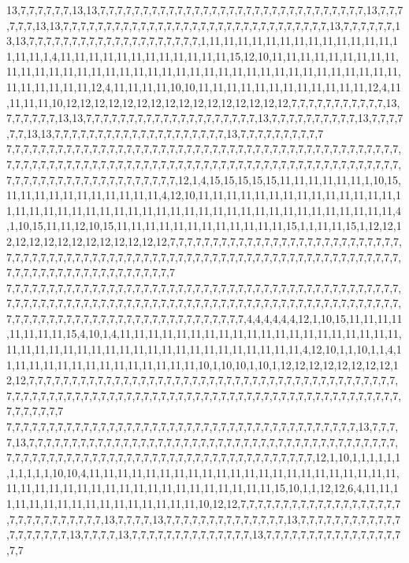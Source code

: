 13,7,7,7,7,7,7,13,13,7,7,7,7,7,7,7,7,7,7,7,7,7,7,7,7,7,7,7,7,7,7,7,7,7,7,7,7,7,7,7,13,7,7,7,7,7,7,13,13,7,7,7,7,7,7,7,7,7,7,7,7,7,7,7,7,7,7,7,7,7,7,7,7,7,7,7,7,7,7,7,13,7,7,7,7,7,7,13,13,7,7,7,7,7,7,7,7,7,7,7,7,7,7,7,7,7,7,7,7,1,11,11,11,11,11,11,11,11,11,11,11,11,11,11,11,11,1,4,11,11,11,11,11,11,11,11,11,11,11,11,15,12,10,11,11,11,11,11,11,11,11,11,11,11,11,11,11,11,11,11,11,11,11,11,11,11,11,11,11,11,11,11,11,11,11,11,11,11,11,11,11,11,11,11,11,11,12,4,11,11,11,11,10,10,11,11,11,11,11,11,11,11,11,11,11,11,12,4,11,11,11,11,10,12,12,12,12,12,12,12,12,12,12,12,12,12,12,12,12,7,7,7,7,7,7,7,7,7,7,7,13,7,7,7,7,7,7,13,13,7,7,7,7,7,7,7,7,7,7,7,7,7,7,7,7,7,7,7,7,13,7,7,7,7,7,7,7,7,7,7,13,7,7,7,7,7,7,13,13,7,7,7,7,7,7,7,7,7,7,7,7,7,7,7,7,7,7,7,7,13,7,7,7,7,7,7,7,7,7,7
7,7,7,7,7,7,7,7,7,7,7,7,7,7,7,7,7,7,7,7,7,7,7,7,7,7,7,7,7,7,7,7,7,7,7,7,7,7,7,7,7,7,7,7,7,7,7,7,7,7,7,7,7,7,7,7,7,7,7,7,7,7,7,7,7,7,7,7,7,7,7,7,7,7,7,7,7,7,7,7,7,7,7,7,7,7,7,7,7,7,7,7,7,7,7,7,7,7,7,7,7,7,7,7,7,7,7,7,7,7,7,7,12,1,4,15,15,15,15,15,11,11,11,11,11,11,1,10,15,11,11,11,11,11,11,11,11,11,11,11,4,12,10,11,11,11,11,11,11,11,11,11,11,11,11,11,11,11,11,11,11,11,11,11,11,11,11,11,11,11,11,11,11,11,11,11,11,11,11,11,11,11,11,11,11,4,1,10,15,11,11,12,10,15,11,11,11,11,11,11,11,11,11,11,11,11,15,1,1,11,11,15,1,12,12,12,12,12,12,12,12,12,12,12,12,12,12,7,7,7,7,7,7,7,7,7,7,7,7,7,7,7,7,7,7,7,7,7,7,7,7,7,7,7,7,7,7,7,7,7,7,7,7,7,7,7,7,7,7,7,7,7,7,7,7,7,7,7,7,7,7,7,7,7,7,7,7,7,7,7,7,7,7,7,7,7,7,7,7,7,7,7,7,7,7,7,7,7,7,7,7,7,7,7,7,7,7,7,7,7
7,7,7,7,7,7,7,7,7,7,7,7,7,7,7,7,7,7,7,7,7,7,7,7,7,7,7,7,7,7,7,7,7,7,7,7,7,7,7,7,7,7,7,7,7,7,7,7,7,7,7,7,7,7,7,7,7,7,7,7,7,7,7,7,7,7,7,7,7,7,7,7,7,7,7,7,7,7,7,7,7,7,7,7,7,7,7,7,7,7,7,7,7,7,7,7,7,7,7,7,7,7,7,7,7,7,7,7,7,7,7,7,7,7,7,7,7,7,7,7,4,4,4,4,4,4,12,1,10,15,11,11,11,11,11,11,11,11,15,4,10,1,4,11,11,11,11,11,11,11,11,11,11,11,11,11,11,11,11,11,11,11,11,11,11,11,11,11,11,11,11,11,11,11,11,11,11,11,11,11,11,11,11,11,4,12,10,1,1,10,1,1,4,11,11,11,11,11,11,11,11,11,11,11,11,11,11,10,1,10,10,1,10,1,12,12,12,12,12,12,12,12,12,12,7,7,7,7,7,7,7,7,7,7,7,7,7,7,7,7,7,7,7,7,7,7,7,7,7,7,7,7,7,7,7,7,7,7,7,7,7,7,7,7,7,7,7,7,7,7,7,7,7,7,7,7,7,7,7,7,7,7,7,7,7,7,7,7,7,7,7,7,7,7,7,7,7,7,7,7,7,7,7,7,7,7,7,7,7,7,7,7,7,7,7,7,7,7,7,7
7,7,7,7,7,7,7,7,7,7,7,7,7,7,7,7,7,7,7,7,7,7,7,7,7,7,7,7,7,7,7,7,7,7,7,7,7,7,7,7,7,13,7,7,7,7,13,7,7,7,7,7,7,7,7,7,7,7,7,7,7,7,7,7,7,7,7,7,7,7,7,7,7,7,7,7,7,7,7,7,7,7,7,7,7,7,7,7,7,7,7,7,7,7,7,7,7,7,7,7,7,7,7,7,7,7,7,7,7,7,7,7,7,7,7,7,7,7,7,7,7,7,7,7,7,7,12,1,10,1,1,1,1,1,1,1,1,1,1,1,10,10,4,11,11,11,11,11,11,11,11,11,11,11,11,11,11,11,11,11,11,11,11,11,11,11,11,11,11,11,11,11,11,11,11,11,11,11,11,11,11,11,11,11,15,10,1,1,12,12,6,4,11,11,11,11,11,11,11,11,11,11,11,11,11,11,11,11,10,12,12,7,7,7,7,7,7,7,7,7,7,7,7,7,7,7,7,7,7,7,7,7,7,7,7,7,7,7,7,7,7,13,7,7,7,7,13,7,7,7,7,7,7,7,7,7,7,7,7,7,7,13,7,7,7,7,7,7,7,7,7,7,7,7,7,7,7,7,7,7,7,13,7,7,7,7,13,7,7,7,7,7,7,7,7,7,7,7,7,7,7,13,7,7,7,7,7,7,7,7,7,7,7,7,7,7,7,7,7,7
